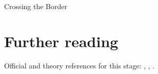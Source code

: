 \begin{ledger}{Crossing the Border}
\end{ledger}

\section{Further reading}
\label{sec:crossing_the_border:further_reading}
Official and theory references for this stage: \cite{GEANT4:2002zbu}, \cite{CMS:2008xjf}, \cite{Wigmans:2000vf}.

\begin{pitfalls}
\end{pitfalls}

\begin{exercises}
\item {}
\item {}
\end{exercises}
